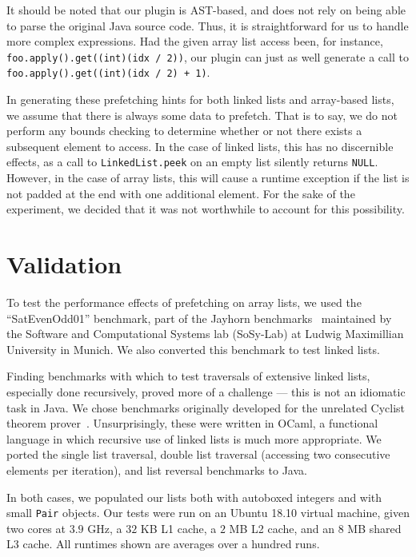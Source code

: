 \documentclass[journal]{IEEEtran}
\begin{document}
It should be noted that our plugin is AST-based, and does not rely on being able to parse the original Java source code. Thus, it is straightforward for us to handle more complex expressions. Had the given array list access been, for instance, \lstinline{foo.apply().get((int)(idx / 2))}, our plugin can just as well generate a call to \lstinline{foo.apply().get((int)(idx / 2) + 1)}.

In generating these prefetching hints for both linked lists and array-based lists, we assume that there is always some data to prefetch. That is to say, we do not perform any bounds checking to determine whether or not there exists a subsequent element to access. In the case of linked lists, this has no discernible effects, as a call to \texttt{LinkedList.peek} on an empty list silently returns \texttt{NULL}. However, in the case of array lists, this will cause a runtime exception if the list is not padded at the end with one additional element. For the sake of the experiment, we decided that it was not worthwhile to account for this possibility.


\section{Validation}

To test the performance effects of prefetching on array lists, we used the ``SatEvenOdd01'' benchmark, part of the Jayhorn benchmarks~\cite{jayhorn} maintained by the Software and Computational Systems lab (SoSy-Lab) at Ludwig Maximillian University in Munich. We also converted this benchmark to test linked lists.

Finding benchmarks with which to test traversals of extensive linked lists, especially done recursively, proved more of a challenge --- this is not an idiomatic task in Java. We chose benchmarks originally developed for the unrelated Cyclist theorem prover~\cite{cyclist}. Unsurprisingly, these were written in OCaml, a functional language in which recursive use of linked lists is much more appropriate. We ported the single list traversal, double list traversal (accessing two consecutive elements per iteration), and list reversal benchmarks to Java.

In both cases, we populated our lists both with autoboxed integers and with small \texttt{Pair} objects. Our tests were run on an Ubuntu 18.10 virtual machine, given two cores at $3.9$ GHz, a $32$ KB L1 cache, a $2$ MB L2 cache, and an $8$ MB shared L3 cache. All runtimes shown are averages over a hundred runs.
\end{document}
